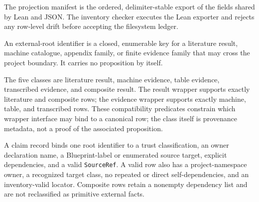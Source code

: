 \begin{definition}
  \label{def:source-projection}
  \leanok
  The projection manifest is the ordered, delimiter-stable export of the
  fields shared by Lean and JSON.  The inventory checker executes the Lean
  exporter and rejects any row-level drift before accepting the filesystem
  ledger.
\end{definition}

\begin{definition}
  \label{def:external-root-id}
  \leanok
  An external-root identifier is a closed, enumerable key for a literature
  result, machine catalogue, appendix family, or finite evidence family that
  may cross the project boundary.  It carries no proposition by itself.
\end{definition}

\begin{definition}
  \label{def:external-claim-class}
  \leanok
  The five classes are literature result, machine evidence, table evidence,
  transcribed evidence, and composite result.  The result wrapper supports
  exactly literature and composite rows; the evidence wrapper supports exactly
  machine, table, and transcribed rows.  These compatibility predicates
  constrain which wrapper interface may bind to a canonical row; the class
  itself is provenance metadata, not a proof of the associated proposition.
\end{definition}

\begin{definition}
  \label{def:external-claim-record}
  \leanok
  A claim record binds one root identifier to a trust classification, an owner
  declaration name, a Blueprint-label or enumerated source target, explicit
  dependencies, and a valid \texttt{SourceRef}.  A valid row also has a
  project-namespace owner, a
  recognized target class, no repeated or direct self-dependencies, and an
  inventory-valid locator.  Composite rows retain a nonempty dependency list
  and are not reclassified as primitive external facts.
\end{definition}

